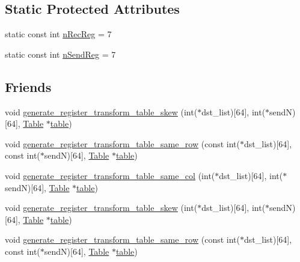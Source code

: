 \subsection*{Static Protected Attributes}
\begin{DoxyCompactItemize}
\item 
static const int \mbox{\hyperlink{classRlmpiInitializer_aaa7c2d3bd7adc3f8732e96499662c48e}{n\+Rec\+Reg}} = 7
\item 
static const int \mbox{\hyperlink{classRlmpiInitializer_a1a0f38c000cd681f6cd8d7e437413549}{n\+Send\+Reg}} = 7
\end{DoxyCompactItemize}
\subsection*{Friends}
\begin{DoxyCompactItemize}
\item 
void \mbox{\hyperlink{classRlmpiInitializer_afaced218e7f30bd432eb4b19d898b4e6}{generate\+\_\+register\+\_\+transform\+\_\+table\+\_\+skew}} (int($\ast$dst\+\_\+list)\mbox{[}64\mbox{]}, int($\ast$sendN)\mbox{[}64\mbox{]}, \mbox{\hyperlink{structTable}{Table}} $\ast$\mbox{\hyperlink{classRlmpiInitializer_a23796d30caf16cdf78e08ebe5a708588}{table}})
\item 
void \mbox{\hyperlink{classRlmpiInitializer_af5b98639ee3f637ee3b94b890a8f8ea1}{generate\+\_\+register\+\_\+transform\+\_\+table\+\_\+same\+\_\+row}} (const int($\ast$dst\+\_\+list)\mbox{[}64\mbox{]}, const int($\ast$sendN)\mbox{[}64\mbox{]}, \mbox{\hyperlink{structTable}{Table}} $\ast$\mbox{\hyperlink{classRlmpiInitializer_a23796d30caf16cdf78e08ebe5a708588}{table}})
\item 
void \mbox{\hyperlink{classRlmpiInitializer_ac67b230ec20837a9ead28023dcfe7332}{generate\+\_\+register\+\_\+transform\+\_\+table\+\_\+same\+\_\+col}} (int($\ast$dst\+\_\+list)\mbox{[}64\mbox{]}, int($\ast$sendN)\mbox{[}64\mbox{]}, \mbox{\hyperlink{structTable}{Table}} $\ast$\mbox{\hyperlink{classRlmpiInitializer_a23796d30caf16cdf78e08ebe5a708588}{table}})
\item 
void \mbox{\hyperlink{classRlmpiInitializer_afaced218e7f30bd432eb4b19d898b4e6}{generate\+\_\+register\+\_\+transform\+\_\+table\+\_\+skew}} (int($\ast$dst\+\_\+list)\mbox{[}64\mbox{]}, int($\ast$sendN)\mbox{[}64\mbox{]}, \mbox{\hyperlink{structTable}{Table}} $\ast$\mbox{\hyperlink{classRlmpiInitializer_a23796d30caf16cdf78e08ebe5a708588}{table}})
\item 
void \mbox{\hyperlink{classRlmpiInitializer_af5b98639ee3f637ee3b94b890a8f8ea1}{generate\+\_\+register\+\_\+transform\+\_\+table\+\_\+same\+\_\+row}} (const int($\ast$dst\+\_\+list)\mbox{[}64\mbox{]}, const int($\ast$sendN)\mbox{[}64\mbox{]}, \mbox{\hyperlink{structTable}{Table}} $\ast$\mbox{\hyperlink{classRlmpiInitializer_a23796d30caf16cdf78e08ebe5a708588}{table}})

\end{DoxyCompactItemize}
